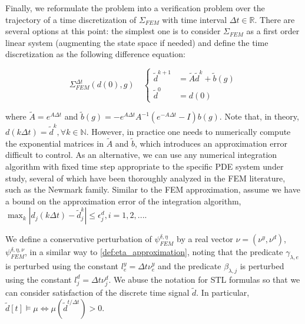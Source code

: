 \documentclass[letterpaper, 10 pt, conference]{ieeeconf/ieeeconf}
\newcommand*{\R}{\mathbb{R}}
\newcommand*{\N}{\mathbb{N}}
\newcommand{\Always}{\mathbf{G}}
\begin{document}
Finally, we reformulate the problem into a verification problem over the
trajectory of a time discretization of $\Sigma_{FEM}$ with time interval $\Delta
t \in \R$. There are several options at this point: the simplest one is to
consider $\Sigma_{FEM}$ as a first order linear system (augmenting the state
space if needed) and define the time discretization as the following difference
equation:

\begin{equation}
    \label{eq:disc_system}
    \Sigma_{FEM}^{\Delta t}(d(0), g) \quad \left\{
    \begin{aligned}
        \tilde d^{k+1} &= \tilde A \tilde d^k + \tilde b(g) \\
        \tilde d^0 &= d(0)
    \end{aligned}
    \right.
\end{equation}

where $\tilde A = e^{A \Delta t}$ and $\tilde b(g) = - e^{A \Delta t} A^{-1} 
( e^{- A \Delta t} - I ) b(g)$. Note that, in theory, $d(k \Delta t) = \tilde d^k,
\forall k \in \N$. However, in practice one needs to numerically compute the
exponential matrices in $\tilde A$ and $\tilde b$, which introduces an
approximation error difficult to control. As an alternative, we can use any
numerical integration algorithm with fixed time step appropriate to the specific
PDE system under study, several of which have been
thoroughly analyzed in the FEM literature, such as the Newmark family. Similar
to the FEM approximation, assume we have a bound on the approximation error of
the integration algorithm, $\max_k |d_j(k \Delta t) - \tilde d^k_j| \leq
\epsilon^d_j, i=1,2,...$.

We define a conservative perturbation of $\psi^{\delta, \eta}_{FEM}$ by a real
vector $\nu = (\nu^y, \nu^d)$, $\psi^{\delta, \eta, \nu}_{FEM}$, in a similar
way to \cref{def:eta_approximation}, noting that the predicate $\gamma_{\lambda, e}$ is perturbed
using the constant $l_e^y = \Delta t \nu^y_e$ and the predicate $\beta_{\lambda, j}$ is
perturbed using the constant $l_j^d = \Delta t \nu^d_j$. We abuse the notation
for STL formulas so that we can consider satisfaction of the discrete time
signal $\tilde{d}$. In particular, $\tilde{d}[t] \models \mu \iff
\mu(\tilde{d}^{t / \Delta t}) > 0$.
\end{document}
